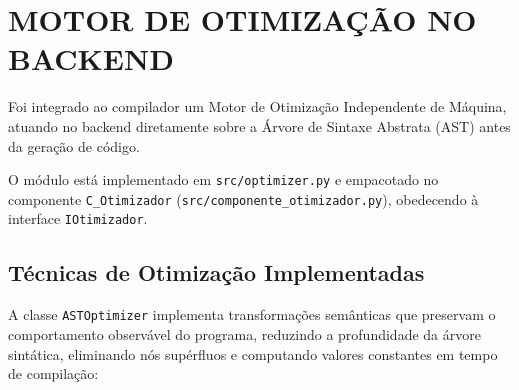 \chapter{MOTOR DE OTIMIZAÇÃO NO BACKEND}

Foi integrado ao compilador um Motor de Otimização Independente de Máquina, atuando no backend diretamente sobre a Árvore de Sintaxe Abstrata (AST) antes da geração de código.

O módulo está implementado em \texttt{src/optimizer.py} e empacotado no componente \texttt{C\_Otimizador} (\texttt{src/componente\_otimizador.py}), obedecendo à interface \texttt{IOtimizador}.

\section{Técnicas de Otimização Implementadas}

A classe \texttt{ASTOptimizer} implementa transformações semânticas que preservam o comportamento observável do programa, reduzindo a profundidade da árvore sintática, eliminando nós supérfluos e computando valores constantes em tempo de compilação:

